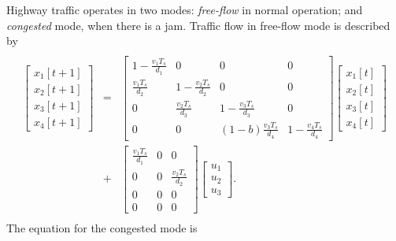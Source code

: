 \documentclass[letterpaper,10pt,english]{sphinxmanual}
\begin{document}
Highway traffic operates in two modes: \emph{free-flow} in normal operation;
and \emph{congested} mode, when there is a jam. Traffic flow in free-flow
mode is described by
\label{main_source:equation-fflow}\begin{gather}
\begin{split}\begin{aligned}
\left[\begin{array}{c}
x_1[t+1]\\
x_2[t+1]\\
x_3[t+1]\\
x_4[t+1]\end{array}\right] & = & \left[\begin{array}{cccc}
1-\frac{v_1T_s}{d_1} & 0 & 0 & 0\\
\frac{v_1T_s}{d_2} & 1-\frac{v_2T_s}{d_2} & 0 & 0\\
0 & \frac{v_2T_s}{d_3} & 1-\frac{v_3T_s}{d_3} & 0\\
0 & 0 & (1-b)\frac{v_3T_s}{d_4} & 1-\frac{v_4T_s}{d_4}\end{array}\right]
\left[\begin{array}{c}
x_1[t]\\
x_2[t]\\
x_3[t]\\
x_4[t]\end{array}\right] \nonumber\\
& + & \left[\begin{array}{ccc}
\frac{v_1T_s}{d_1} & 0 & 0\\
0 & 0 & \frac{v_2T_s}{d_2}\\
0 & 0 & 0\\
0 & 0 & 0\end{array}\right]\left[\begin{array}{c}
u_1\\
u_2\\
u_3\end{array}\right].\end{aligned}\end{split}\label{main_source-fflow}
\end{gather}
The equation for the congested mode is
\end{document}

